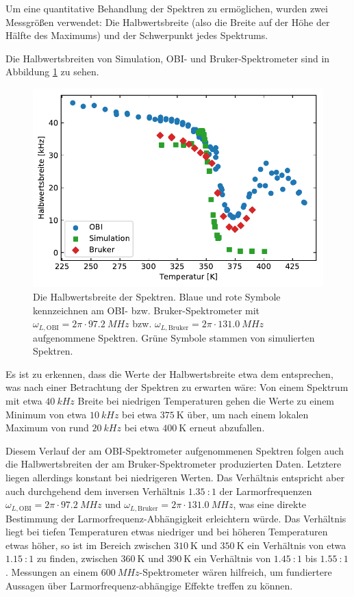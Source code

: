 Um eine quantitative Behandlung der Spektren zu ermöglichen, wurden zwei Messgrößen verwendet: Die Halbwertsbreite (also die Breite auf der Höhe der Hälfte des Maximums) und der Schwerpunkt jedes Spektrums. 

Die Halbwertsbreiten von Simulation, OBI- und Bruker-Spektrometer sind in Abbildung \ref{fig:res:spek_fwhm} zu sehen.
\begin{figure}
	\begin{center}
		\includegraphics[width=.9\textwidth]{graphics/plot/fwhm.pdf}
	\end{center}
	\caption{Die Halbwertsbreite der Spektren. Blaue und rote Symbole kennzeichnen am OBI- bzw. Bruker-Spektrometer mit $\omega_{L, \text{OBI}} = 2\pi \cdot \SI{97.2}{MHz}$ bzw. $\omega_{L, \text{Bruker}} = 2\pi \cdot \SI{131.0}{MHz}$ aufgenommene Spektren. Grüne Symbole stammen von simulierten Spektren.} \label{fig:res:spek_fwhm}
\end{figure}

Es ist zu erkennen, dass die Werte der Halbwertsbreite etwa dem entsprechen, was nach einer Betrachtung der Spektren zu erwarten wäre: Von einem Spektrum mit etwa $\SI{40}{kHz}$ Breite bei niedrigen Temperaturen gehen die Werte zu einem Minimum von etwa $\SI{10}{kHz}$ bei etwa $\SI{375}{\kelvin}$ über, um nach einem lokalen Maximum von rund $\SI{20}{kHz}$ bei etwa $\SI{400}{\kelvin}$ erneut abzufallen.

Diesem Verlauf der am OBI-Spektrometer aufgenommenen Spektren folgen auch die Halbwertsbreiten der am Bruker-Spektrometer produzierten Daten. Letztere liegen allerdings konstant bei niedrigeren Werten. Das Verhältnis entspricht aber auch durchgehend dem inversen Verhältnis $\SI{1.35}{} : 1$ der Larmorfrequenzen $\omega_{L, \text{OBI}} = 2\pi \cdot \SI{97.2}{MHz}$ und $\omega_{L, \text{Bruker}} = 2\pi \cdot \SI{131.0}{MHz}$, was eine direkte Bestimmung der Lar\-mor\-fre\-quenz-Ab\-häng\-ig\-keit erleichtern würde. Das Verhältnis liegt bei tiefen Temperaturen etwas niedriger und bei höheren Temperaturen etwas höher, so ist im Bereich zwischen $\SI{310}{\kelvin}$ und $\SI{350}{\kelvin}$ ein Verhältnis von etwa $\SI{1.15}{}:1$ zu finden, zwischen $\SI{360}{\kelvin}$ und $\SI{390}{\kelvin}$ ein Verhältnis von $\SI{1.45}{}:1$ bis $\SI{1.55}{}:1$. Messungen an einem $\SI{600}{MHz}$-Spektrometer wären hilfreich, um fundiertere Aussagen über Larmorfrequenz-abhängige Effekte treffen zu können.


